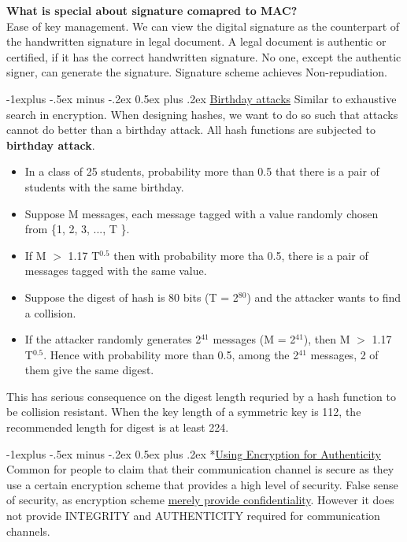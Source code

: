 \documentclass[10pt,landscape]{article}
\makeatletter
\renewcommand{\subsection}{\@startsection{subsection}{2}{0mm}%
                                {-1explus -.5ex minus -.2ex}%
                                {0.5ex plus .2ex}%
                                {\normalfont\normalsize\bfseries}}
\makeatother
\begin{document}
\begin{multicols*}{3}
\textbf{What is special about signature comapred to MAC?}\\
Ease of key management. We can view the digital signature as the counterpart of the
handwritten signature in legal document. A legal document
is authentic or certified, if it has the correct handwritten
signature. No one, except the authentic signer, can generate
the signature. Signature scheme achieves Non-repudiation.


\subsection{\underline{Birthday attacks}}
Similar to exhaustive search in encryption. When designing hashes, we want to do so such that attacks cannot do better than a birthday attack. All hash functions are subjected to \textbf{birthday attack}.

\begin{itemize}
    \item In a class of 25 students, probability more than 0.5 that there is a pair of students with the same birthday.
    \item Suppose M messages, each message tagged with a value randomly chosen from \{1, 2, 3, ..., T \}. 
    \item If M $>$ 1.17 T$^{0.5}$ then with probability more tha 0.5, there is a pair of messages tagged with the same value.
    \item Suppose the digest of hash is 80 bits (T = 2$^{80}$) and the attacker wants to find a collision.
    \item If the attacker randomly generates 2$^{41}$ messages (M = 2$^{41}$), then M $>$ 1.17 T$^{0.5}$. Hence with probability more than 0.5, among the 2$^{41}$ messages, 2 of them give the same digest.
\end{itemize}

This has serious consequence on the digest length requried by a hash function to be collision resistant. When the key length of a symmetric key is 112, the recommended length for digest is at least 224.

\subsection*{\underline{Using Encryption for Authenticity}}
Common for people to claim that their communication channel is secure as they use a certain encryption scheme that provides a high level of security. False sense of security, as encryption scheme \underline{merely provide confidentiality}. However it does not provide INTEGRITY and AUTHENTICITY required for communication channels. \newline


\end{multicols*}
\end{document}
